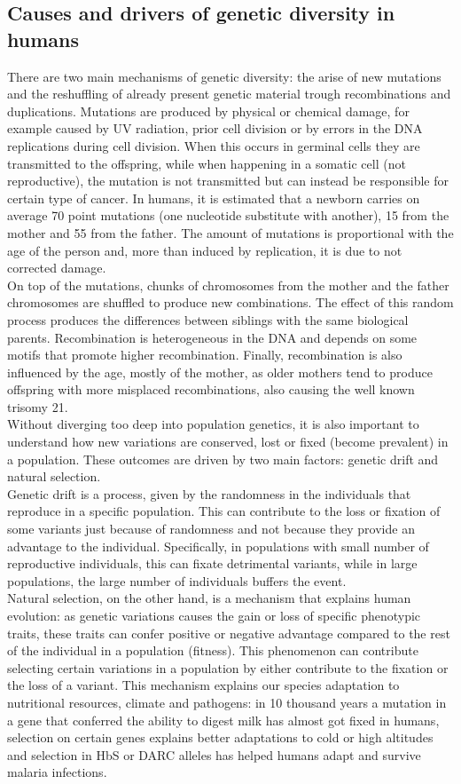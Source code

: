 \subsection{Causes and drivers of genetic diversity in humans}
There are two main mechanisms of genetic diversity: the arise of new mutations and the reshuffling of already present genetic material trough recombinations and duplications. Mutations are produced by physical or chemical damage, for example caused by UV radiation, prior cell division or by errors in the DNA replications during cell division. When this occurs in germinal cells they are transmitted to the offspring, while when happening in a somatic cell (not reproductive), the mutation is not transmitted but can instead be responsible for certain type of cancer. In humans, it is estimated that a newborn carries on average 70 point mutations (one nucleotide substitute with another), 15 from the mother and 55 from the father. The amount of mutations is proportional with the age of the person and, more than induced by replication, it is due to not corrected damage.\\
On top of the mutations, chunks of chromosomes from the mother and the father chromosomes are shuffled to produce new combinations. The effect of this random process produces the differences between siblings with the same biological parents. Recombination is heterogeneous in the DNA and depends on some motifs that promote higher recombination. Finally, recombination is also influenced by the age, mostly of the mother, as older mothers tend to produce offspring with more misplaced recombinations, also causing the well known trisomy 21.\\
Without diverging too deep into population genetics, it is also important to understand how new variations are conserved, lost or fixed (become prevalent) in a population. These outcomes are driven by two main factors: genetic drift and natural selection.\\
Genetic drift is a process, given by the randomness in the individuals that reproduce in a specific population. This can contribute to the loss or fixation of some variants just because of randomness and not because they provide an advantage to the individual. Specifically, in populations with small number of reproductive individuals, this can fixate detrimental variants, while in large populations, the large number of individuals buffers the event. \\
Natural selection, on the other hand, is a mechanism that explains human evolution: as genetic variations causes the gain or loss of specific phenotypic traits, these traits can confer positive or negative advantage compared to the rest of the individual in a population (fitness). This phenomenon can contribute selecting certain variations in a population by either contribute to the fixation or the loss of a variant. This mechanism explains our species adaptation to nutritional resources, climate and pathogens: in 10 thousand years a mutation in a gene that conferred the ability to digest milk has almost got fixed in humans, selection on certain genes explains better adaptations to cold or high altitudes and selection in HbS or DARC alleles has helped humans adapt and survive malaria infections\cite{genome_diversity_quintana}. 
